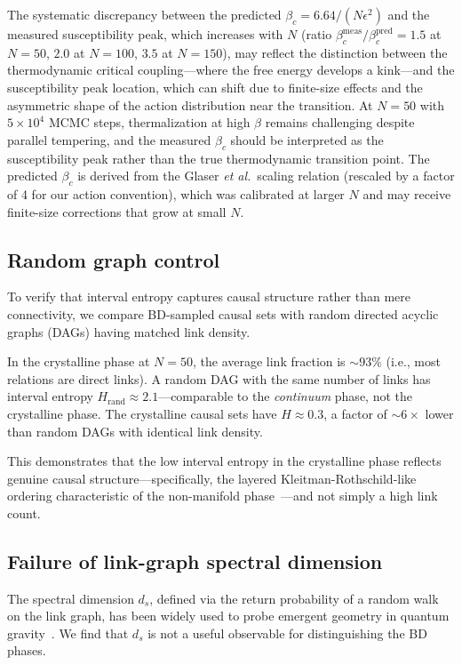 \documentclass[aps,prd,twocolumn,superscriptaddress,nofootinbib]{revtex4-2}
\begin{document}
The systematic discrepancy between the predicted $\beta_c = 6.64/(N\epsilon^2)$ and the measured susceptibility peak, which increases with $N$ (ratio $\beta_c^{\mathrm{meas}}/\beta_c^{\mathrm{pred}} = 1.5$ at $N=50$, $2.0$ at $N=100$, $3.5$ at $N=150$), may reflect the distinction between the thermodynamic critical coupling---where the free energy develops a kink---and the susceptibility peak location, which can shift due to finite-size effects and the asymmetric shape of the action distribution near the transition. At $N = 50$ with $5 \times 10^4$ MCMC steps, thermalization at high $\beta$ remains challenging despite parallel tempering, and the measured $\beta_c$ should be interpreted as the susceptibility peak rather than the true thermodynamic transition point. The predicted $\beta_c$ is derived from the Glaser \emph{et al.}\ scaling relation (rescaled by a factor of 4 for our action convention), which was calibrated at larger $N$ and may receive finite-size corrections that grow at small $N$.

\subsection{Random graph control}

To verify that interval entropy captures causal structure rather than mere connectivity, we compare BD-sampled causal sets with random directed acyclic graphs (DAGs) having matched link density.

In the crystalline phase at $N = 50$, the average link fraction is $\sim$$93\%$ (i.e., most relations are direct links). A random DAG with the same number of links has interval entropy $H_{\mathrm{rand}} \approx 2.1$---comparable to the \emph{continuum} phase, not the crystalline phase. The crystalline causal sets have $H \approx 0.3$, a factor of $\sim$$6\times$ lower than random DAGs with identical link density.

This demonstrates that the low interval entropy in the crystalline phase reflects genuine causal structure---specifically, the layered Kleitman-Rothschild-like ordering characteristic of the non-manifold phase~\cite{loomis2018}---and not simply a high link count.

\subsection{Failure of link-graph spectral dimension}

The spectral dimension $d_s$, defined via the return probability of a random walk on the link graph, has been widely used to probe emergent geometry in quantum gravity~\cite{carlip2017}. We find that $d_s$ is not a useful observable for distinguishing the BD phases.
\end{document}
